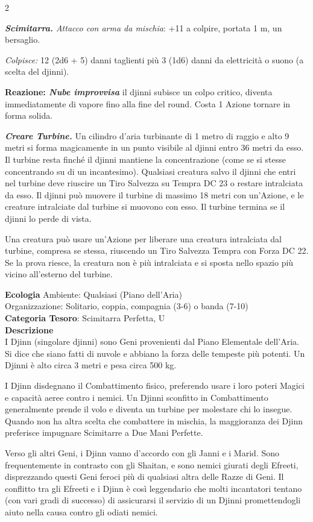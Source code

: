 \begin{multicols}{2}
{\emph{\textbf{Scimitarra.} Attacco con arma da mischia}: +11 a colpire, portata 1 m, un bersaglio.

\emph{Colpisce:} 12 (2d6 + 5) danni taglienti più 3 (1d6) danni da elettricità o suono (a scelta del djinni).

\textbf{Reazione: \emph{Nube improvvisa}} il djinni subisce un colpo critico, diventa immediatamente di vapore fino alla fine del round. Costa 1 Azione tornare in forma solida.

\emph{\textbf{Creare Turbine.}} Un cilindro d'aria turbinante di 1 metro di raggio e alto 9 metri si forma magicamente in un punto visibile al djinni entro 36 metri da esso. Il turbine resta finché il djinni mantiene la concentrazione (come se si stesse concentrando su di un incantesimo). Qualsiasi creatura salvo il djinni che entri nel turbine deve riuscire un Tiro Salvezza su Tempra DC 23 o restare intralciata da esso. Il djinni può muovere il turbine di massimo 18 metri con un'Azione, e le creature intralciate dal turbine si muovono con esso. Il turbine termina se il djinni lo perde di vista.

Una creatura può usare un'Azione per liberare una creatura intralciata dal turbine, compresa se stessa, riuscendo un Tiro Salvezza Tempra con Forza DC 22. Se la prova riesce, la creatura non è più intralciata e si sposta nello spazio più vicino all'esterno del turbine.

\textbf{Ecologia}
Ambiente: Qualsiasi (Piano dell'Aria)\\
Organizzazione: Solitario, coppia, compagnia (3-6) o banda (7-10)\\
\textbf{Categoria Tesoro}: Scimitarra Perfetta, U\\
\textbf{Descrizione}\\
I Djinn (singolare djinni) sono Geni provenienti dal Piano Elementale dell'Aria. Si dice che siano fatti di nuvole e abbiano la forza delle tempeste più potenti. Un Djinni è alto circa 3 metri e pesa circa 500 kg.

I Djinn disdegnano il Combattimento fisico, preferendo usare i loro poteri Magici e capacità aeree contro i nemici. Un Djinni sconfitto in Combattimento generalmente prende il volo e diventa un turbine per molestare chi lo insegue. Quando non ha altra scelta che combattere in mischia, la maggioranza dei Djinn preferisce impugnare Scimitarre a Due Mani Perfette.

Verso gli altri Geni, i Djinn vanno d'accordo con gli Janni e i Marid. Sono frequentemente in contrasto con gli Shaitan, e sono nemici giurati degli Efreeti, disprezzando questi Geni feroci più di qualsiasi altra delle Razze di Geni. Il conflitto tra gli Efreeti e i Djinn è così leggendario che molti incantatori tentano (con vari gradi di successo) di assicurarsi il servizio di un Djinni promettendogli aiuto nella causa contro gli odiati nemici.

}
\end{multicols}
